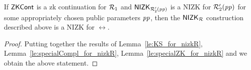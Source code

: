 \begin{corollary}
If ${\mathsf{ZKCont}}$ is a zk continuation for $\mathcal{R}_1$ and ${\mathsf{NIZK_{\mathcal{R}'_2(\mathit{pp})}}}$ is a NIZK for $\mathcal{R}_2'(\mathit{pp})$ for some appropriately chosen public parameters $\mathit{pp}$, 
then the ${\mathsf{NIZK_{\mathcal{R}}}}$ construction described above is a NIZK for $\rel$.
 \end{corollary}
 
\begin{proof} Putting together the results of Lemma~\ref{le:KS_for_nizkR}, Lemma~\ref{le:specialCompl_for_nizkR}, 
Lemma~\ref{le:specialZK_for_nizkR} and  we obtain the above statement.
\end{proof} 
